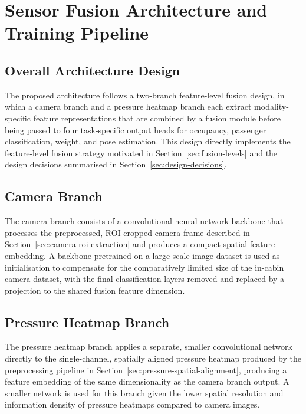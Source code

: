 \chapter{Sensor Fusion Architecture and Training Pipeline}
\label{ch:fusion-architecture}

\section{Overall Architecture Design}
\label{sec:overall-architecture-design}
The proposed architecture follows a two-branch feature-level fusion
design, in which a camera branch and a pressure heatmap branch each
extract modality-specific feature representations that are combined by a
fusion module before being passed to four task-specific output heads for
occupancy, passenger classification, weight, and pose estimation. This
design directly implements the feature-level fusion strategy motivated in
Section~\ref{sec:fusion-levels} and the design decisions summarised in
Section~\ref{sec:design-decisions}.

\section{Camera Branch}
\label{sec:camera-branch}
The camera branch consists of a convolutional neural network backbone
that processes the preprocessed, ROI-cropped camera frame described in
Section~\ref{sec:camera-roi-extraction} and produces a compact spatial
feature embedding. A backbone pretrained on a large-scale image dataset
is used as initialisation to compensate for the comparatively limited
size of the in-cabin camera dataset, with the final classification layers
removed and replaced by a projection to the shared fusion feature
dimension.

\section{Pressure Heatmap Branch}
\label{sec:pressure-branch}
The pressure heatmap branch applies a separate, smaller convolutional
network directly to the single-channel, spatially aligned pressure
heatmap produced by the preprocessing pipeline in
Section~\ref{sec:pressure-spatial-alignment}, producing a feature
embedding of the same dimensionality as the camera branch output. A
smaller network is used for this branch given the lower spatial
resolution and information density of pressure heatmaps compared to
camera images.


